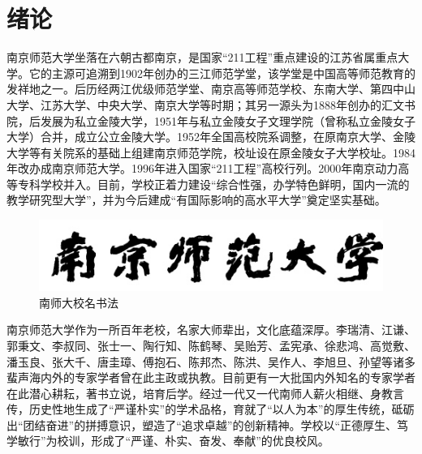\documentclass[UTF8,a4paper,twoside,zihao=-4]{ctexrep}
\theoremstyle{nonumberplain}
\begin{document}


\tableofcontents\newpage\mbox{}\thispagestyle{empty}\newpage
\clearpage{}
\chapter{绪论}
南京师范大学坐落在六朝古都南京，是国家“211工程”重点建设的江苏省属重点大学。它的主源可追溯到1902年创办的三江师范学堂，该学堂是中国高等师范教育的发祥地之一。后历经两江优级师范学堂、南京高等师范学校、东南大学、第四中山大学、江苏大学、中央大学、南京大学等时期；其另一源头为1888年创办的汇文书院，后发展为私立金陵大学，1951年与私立金陵女子文理学院（曾称私立金陵女子大学）合并，成立公立金陵大学。1952年全国高校院系调整，在原南京大学、金陵大学等有关院系的基础上组建南京师范学院，校址设在原金陵女子大学校址。1984年改办成南京师范大学。1996年进入国家``211工程''高校行列。2000年南京动力高等专科学校并入。目前，学校正着力建设“综合性强，办学特色鲜明，国内一流的教学研究型大学”，并为今后建成“有国际影响的高水平大学”奠定坚实基础。
\begin{figure}[htb]
    \centering
    \includegraphics[scale=.6]{cover/nnu_caligraphy.png}
    \caption{南师大校名书法}\label{fig:caligraphy}
\end{figure}

南京师范大学作为一所百年老校，名家大师辈出，文化底蕴深厚。李瑞清、江谦、郭秉文、李叔同、张士一、陶行知、陈鹤琴、吴贻芳、孟宪承、徐悲鸿、高觉敷、潘玉良、张大千、唐圭璋、傅抱石、陈邦杰、陈洪、吴作人、李旭旦、孙望等诸多蜚声海内外的专家学者曾在此主政或执教。目前更有一大批国内外知名的专家学者在此潜心耕耘，著书立说，培育后学。经过一代又一代南师人薪火相继、身教言传，历史性地生成了``严谨朴实''的学术品格，育就了“以人为本”的厚生传统，砥砺出``团结奋进''的拼搏意识，塑造了``追求卓越''的创新精神。学校以``正德厚生、笃学敏行''为校训，形成了``严谨、朴实、奋发、奉献''的优良校风。
　　　
\end{document}
